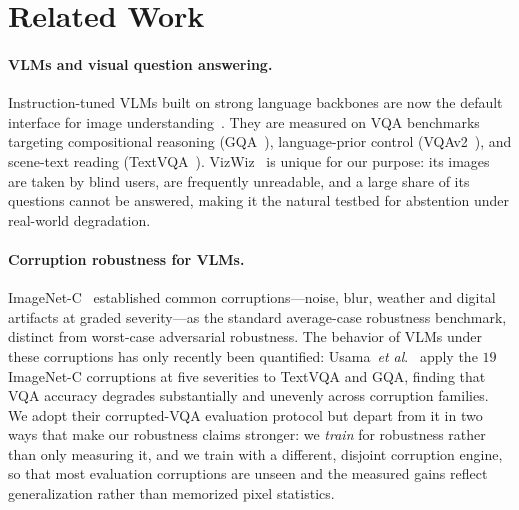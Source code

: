 \documentclass[10pt,twocolumn,letterpaper]{article}
\makeatletter
\providecommand{\etal}{\textit{et al}.\@\xspace}
\makeatother
\begin{document}
\section{Related Work}
\label{sec:related}

\paragraph{VLMs and visual question answering.}
Instruction-tuned VLMs built on strong language backbones are now the default interface
for image understanding~\cite{qwen3vl2025}. They are measured on VQA benchmarks
targeting compositional reasoning (GQA~\cite{hudson2019gqa}), language-prior control
(VQAv2~\cite{goyal2017vqav2}), and scene-text reading (TextVQA~\cite{singh2019textvqa}).
VizWiz~\cite{gurari2018vizwiz} is unique for our purpose: its images are taken by blind
users, are frequently unreadable, and a large share of its questions cannot be answered,
making it the natural testbed for abstention under real-world degradation.

\paragraph{Corruption robustness for VLMs.}
ImageNet-C~\cite{hendrycks2019imagenetc} established common corruptions---noise, blur,
weather and digital artifacts at graded severity---as the standard average-case
robustness benchmark, distinct from worst-case adversarial robustness. The behavior of
VLMs under these corruptions has only recently been quantified:
Usama~\etal~\cite{usama2025analysing} apply the $19$ ImageNet-C corruptions at five
severities to TextVQA and GQA, finding that VQA accuracy degrades substantially and
unevenly across corruption families. We adopt their corrupted-VQA evaluation protocol but
depart from it in two ways that make our robustness claims stronger: we \emph{train} for
robustness rather than only measuring it, and we train with a different, disjoint
corruption engine, so that most evaluation corruptions are unseen and the measured gains
reflect generalization rather than memorized pixel statistics.
\end{document}
